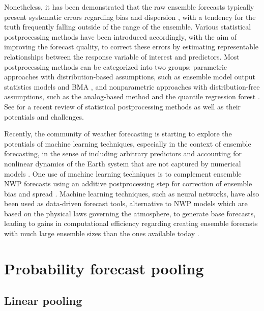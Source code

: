 \documentclass[11pt]{article}
\begin{document}
Nonetheless, it has been demonstrated that the raw ensemble forecasts typically present systematic errors regarding bias \citep{Atger2003-lx,Mass2003-bc} and dispersion \citep{Buizza2005-wf,Sloughter2010-ae}, with a tendency for the truth frequently falling outside of the range of the ensemble. Various statistical postprocessing methods have been introduced accordingly, with the aim of improving the forecast quality, to correct these errors by estimating representable relationships between the response variable of interest and predictors. Most postprocessing methods can be categorized into two groups: parametric approaches with distribution-based assumptions, such as ensemble model output statistics \citep[EMOS,][]{Gneiting2005-ua} models and BMA \citep{Raftery2005-xi}, and nonparametric approaches with distribution-free assumptions, such as the analog-based method \citep[e.g.,][]{Delle_Monache2013-os} and the quantile regression forest \citep{Taillardat2019-ni}. See \cite{Vannitsem2021-bg} for a recent review of statistical postprocessing methods as well as their potentials and challenges.

Recently, the community of weather forecasting is starting to explore the potentials of machine learning techniques, especially in the context of ensemble forecasting, in the sense of including arbitrary predictors and accounting for nonlinear dynamics of the Earth system that are not captured by numerical models \citep{Dueben2021-fe}. One use of machine learning techniques is to complement ensemble NWP \citep[numerical weather prediction, see, e.g.,][for a summary of its revolution]{Bauer2015-dg,Benjamin2019-zp} forecasts using an additive postprocessing step for correction of ensemble bias and spread \citep{Rasp2018-zu,Scher2018-dm,Gronquist2021-no}. Machine learning techniques, such as neural networks, have also been used as data-driven forecast tools, alternative to NWP models which are based on the physical laws governing the atmosphere, to generate base forecasts, leading to gains in computational efficiency regarding creating ensemble forecasts with much large ensemble sizes than the ones available today \citep{Dueben2018-ln,Scher2018-of,Rasp2021-az,Scher2021-ee}.

\section{Probability forecast pooling}
\label{sec:probabilistic_forecast_ensembles}

\subsection{Linear pooling}
\label{sec:linear_pooling}
\end{document}
